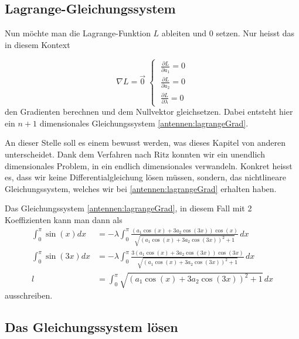 \subsection{Lagrange-Gleichungssystem\label{antennen:lagrangeGLsys}}

Nun möchte man die Lagrange-Funktion $L$ ableiten und 0 setzen. Nur heisst das in diesem Kontext

\begin{equation}
	\nabla L = \vec{0} \;
	\left\{ \;
	\begin{aligned}
		\frac{\partial L}{\partial a_1} = 0 \\
		\frac{\partial L}{\partial a_2} = 0 \\
		\frac{\partial L}{\partial \lambda} = 0
	\end{aligned}
	\right.
	\label{antennen:lagrangeGrad}
\end{equation}
den Gradienten berechnen und dem Nullvektor gleichsetzen. Dabei entsteht hier ein 
$n+1$ dimensionales Gleichungssystem \eqref{antennen:lagrangeGrad}.

An dieser Stelle soll es einem bewusst werden, was dieses Kapitel von anderen 
unterscheidet. Dank dem Verfahren nach Ritz konnten wir ein unendlich dimensionales
Problem, in ein endlich dimensionales verwandeln. 
Konkret heisst es, dass wir keine Differentialgleichung lösen müssen, sondern, 
das nichtlineare Gleichungssystem, welches wir bei \eqref{antennen:lagrangeGrad} erhalten haben.

Das Gleichungssystem \eqref{antennen:lagrangeGrad}, in diesem Fall mit 
2 Koeffizienten kann man dann als
\begin{equation}
	\begin{aligned}
		\int_0^\pi \sin (x) dx
		&=
		-\lambda \int_0^\pi \frac{\left(a_1 \cos (x)+3 a_2 \cos (3 x)\right) 
			\cos (x)}{\sqrt{\left(a_1 \cos (x)+3 a_2 \cos (3 x)\right)^2+1}} \, dx \\
		\int_0^\pi \sin (3 x) dx
		&=
		-\lambda \int_0^\pi \frac{3\left(a_1 \cos (x)+3 a_2 \cos (3 x)\right) 
			\cos (3 x)}{\sqrt{\left(a_1 \cos (x)+3 a_2 \cos (3 x)\right)^2+1}} \, dx \\
		l
		&=
		\int_0^\pi \sqrt{\left(a_1 \cos (x)+3 a_2 \cos (3 x)\right)^2+1} \, dx
	\end{aligned}
	\label{antennen:lagrangeGradKonkret}
\end{equation}
ausschreiben. 

\subsection{Das Gleichungssystem lösen\label{antennen:glSysSolve}}

